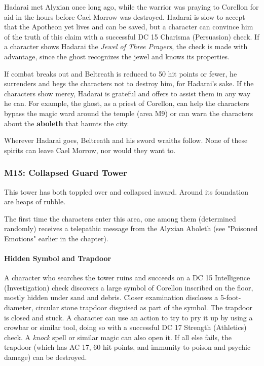 \documentclass[letterpaper, 11pt, bg=full, twocolumn]{dndbook}
\begin{document}
Hadarai met Alyxian once long ago, while the warrior was praying to Corellon for aid in the hours before Cael Morrow was destroyed. Hadarai is slow to accept that the Apotheon yet lives and can be saved, but a character can convince him of the truth of this claim with a successful DC 15 Charisma (Persuasion) check. If a character shows Hadarai the \textit{Jewel of Three Prayers}, the check is made with advantage, since the ghost recognizes the jewel and knows its properties.

If combat breaks out and Beltreath is reduced to 50 hit points or fewer, he surrenders and begs the characters not to destroy him, for Hadarai's sake. If the characters show mercy, Hadarai is grateful and offers to assist them in any way he can. For example, the ghost, as a priest of Corellon, can help the characters bypass the magic ward around the temple (area M9) or can warn the characters about the \textbf{aboleth} that haunts the city.

Wherever Hadarai goes, Beltreath and his sword wraiths follow. None of these spirits can leave Cael Morrow, nor would they want to.

\subsubsection{M15: Collapsed Guard Tower}

\begin{DndReadAloud}
This tower has both toppled over and collapsed inward. Around its foundation are heaps of rubble.
\end{DndReadAloud}

The first time the characters enter this area, one among them (determined randomly) receives a telepathic message from the Alyxian Aboleth (see "Poisoned Emotions" earlier in the chapter).

\paragraph{Hidden Symbol and Trapdoor}

A character who searches the tower ruins and succeeds on a DC 15 Intelligence (Investigation) check discovers a large symbol of Corellon inscribed on the floor, mostly hidden under sand and debris. Closer examination discloses a 5-foot-diameter, circular stone trapdoor disguised as part of the symbol. The trapdoor is closed and stuck. A character can use an action to try to pry it up by using a crowbar or similar tool, doing so with a successful DC 17 Strength (Athletics) check. A \textit{knock} spell or similar magic can also open it. If all else fails, the trapdoor (which has AC 17, 60 hit points, and immunity to poison and psychic damage) can be destroyed.
\end{document}

